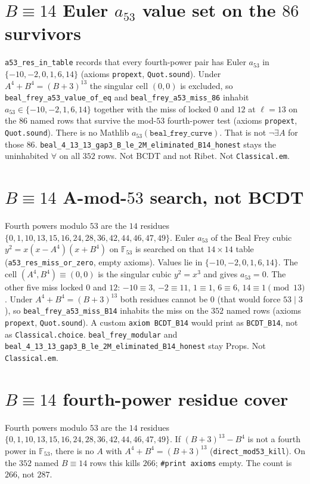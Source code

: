 \documentclass[12pt]{amsart}
\begin{document}
\section{$B\equiv 14$ Euler $a_{53}$ value set on the $86$ survivors}
\texttt{a53\_res\_in\_table} records that every
fourth-power pair has Euler $a_{53}$ in
$\{-10,-2,0,1,6,14\}$
(axioms \texttt{propext}, \texttt{Quot.sound}).
Under $A^4+B^4=(B+3)^{13}$ the singular cell
$(0,0)$ is excluded, so
\texttt{beal\_frey\_a53\_value\_of\_eq} and
\texttt{beal\_frey\_a53\_miss\_86} inhabit
$a_{53}\in\{-10,-2,1,6,14\}$ together with the
miss of locked $0$ and $12$ at $\ell=13$
on the $86$ named rows that survive the
mod-$53$ fourth-power test
(axioms \texttt{propext}, \texttt{Quot.sound}).
There is no Mathlib $a_{53}(\texttt{beal\_frey\_curve})$.
That is not $\neg\exists A$ for those $86$.
\texttt{beal\_4\_13\_13\_gap3\_B\_le\_2M\_eliminated\_B14\_honest}
stays the uninhabited $\forall$ on all $352$ rows.
Not BCDT and not Ribet.  Not \texttt{Classical.em}.

\section{$B\equiv 14$ A-mod-$53$ search, not BCDT}
Fourth powers modulo $53$ are the $14$ residues
$\{0,1,10,13,15,16,24,28,36,42,44,46,47,49\}$.
Euler $a_{53}$ of the Beal Frey cubic
$y^2=x(x-A^4)(x+B^4)$ on $\mathbb{F}_{53}$
is searched on that $14\times 14$ table
(\texttt{a53\_res\_miss\_or\_zero}, empty axioms).
Values lie in $\{-10,-2,0,1,6,14\}$.
The cell $(A^4,B^4)\equiv(0,0)$ is the
singular cubic $y^2=x^3$ and gives $a_{53}=0$.
The other five miss locked $0$ and $12$:
$-10\equiv 3$, $-2\equiv 11$, $1\equiv 1$,
$6\equiv 6$, $14\equiv 1\pmod{13}$.
Under $A^4+B^4=(B+3)^{13}$ both residues cannot
be $0$ (that would force $53\mid 3$), so
\texttt{beal\_frey\_a53\_miss\_B14} inhabits the
miss on the $352$ named rows
(axioms \texttt{propext}, \texttt{Quot.sound}).
A custom \texttt{axiom BCDT\_B14} would print as
\texttt{BCDT\_B14}, not as \texttt{Classical.choice}.
\texttt{beal\_frey\_modular} and
\texttt{beal\_4\_13\_13\_gap3\_B\_le\_2M\_eliminated\_B14\_honest}
stay Props.  Not \texttt{Classical.em}.

\section{$B\equiv 14$ fourth-power residue cover}
Fourth powers modulo $53$ are the $14$ residues
$\{0,1,10,13,15,16,24,28,36,42,44,46,47,49\}$.
If $(B+3)^{13}-B^4$ is not a fourth power in
$\mathbb{F}_{53}$, there is no $A$ with
$A^4+B^4=(B+3)^{13}$
(\texttt{direct\_mod53\_kill}).
On the $352$ named $B\equiv 14$ rows this kills
$266$; \texttt{\#print axioms} empty.  The count
is $266$, not $287$.
\end{document}
